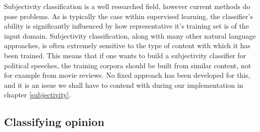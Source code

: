 Subjectivity classification is a well researched field, however current methods do pose problems. As is typically the case within supervised learning, the classifier's ability is significantly influenced by how representative it's training set is of the input domain. Subjectivity classification, along with many other natural language approaches, is often extremely sensitive to the type of content with which it has been trained. This means that if one wants to build a subjectivity classifier for political speeches, the training corpora should be built from similar content, not for example from movie reviews. No fixed approach has been developed for this, and it is an issue we shall have to contend with during our implementation in chapter \ref{subjectivity}. 

\begin{comment}
	
Subjectivity word-sense disambiguation \cite{Akkaya:2009ww}

- typical approaches rely on lexicon of words
	- these are usually word lists rather than meanings (or senses)
	- can lead to false hits i.e. word assumed to imply s, when really it is o
- thus Subjectivity Word Sense Disambiguation
	- labels clue words as subjective or objective sense
	- more feasible than full word-sense
- use SVM
- use bootstrapping to create a training set

- since sentences often contain multiple subjective expressions, expression level classification is more informative than sentence-level classification

Word sense and subjectivity \cite{Wiebe:2006te}
- propose that there are motivations for separate classifiers, one each
- top of page 6 makes very good point about a word typically being subjective, being objective in a subjective sentence

Learning subjective adjectives from a corpora \cite{Wiebe:2000ub}

Effects of adjective orientation \cite{Wiebe:2000tk}
- use word conjunctions to find positive/negative adjectives
	- e.g. would say corrupt and brutal, not corrup or brutal

\end{comment}


\subsection{Classifying opinion}
\label{background:sentiment_classification}

